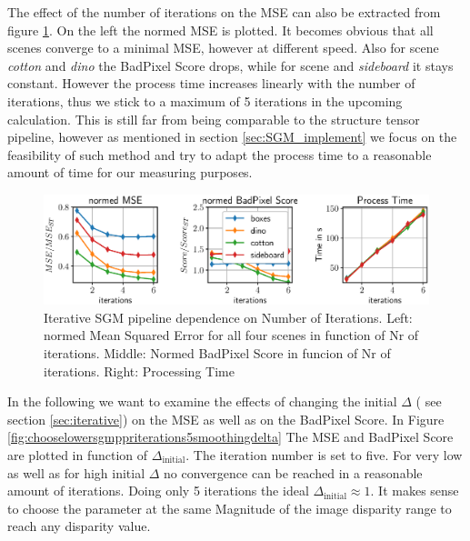 \documentclass  [
  paper    = a4,
  BCOR     = 10mm,
  twoside,
  fontsize = 12pt,
  fleqn,
  toc      = bibnumbered,
  toc      = listofnumbered,
  numbers  = noendperiod,
  headings = normal,
  listof   = leveldown,
  version  = 3.03
]                                       {scrreprt}
\begin{document}
The effect of the number of iterations on the MSE can also be extracted from figure \ref{fig:chooselowersgmpprmergeiterations}. On the left the normed MSE is plotted. It becomes obvious that all scenes converge to a minimal MSE, however at different speed. Also for scene \textit{cotton} and \textit{dino} the BadPixel Score drops, while for scene  and \textit{sideboard} it stays constant. However the process time increases linearly with the number of iterations, thus we stick to a maximum of 5 iterations in the upcoming calculation. This is still far from being comparable to the structure tensor pipeline, however as mentioned in section \ref{sec:SGM_implement} we focus on the feasibility of such method and try to adapt the process time to a reasonable amount of time for our measuring purposes.
\begin{figure}
	\centering
	\includegraphics[width=1\linewidth]{images/choose_lower_sgm_ppr_merge_iterations}
	\caption[Iterative SGM dependence on Number of Iterations]{Iterative SGM pipeline dependence on Number of Iterations. Left: normed Mean Squared Error for all four scenes in function  of Nr of iterations. Middle: Normed BadPixel Score in funcion of Nr of iterations. Right: Processing Time}
	\label{fig:chooselowersgmpprmergeiterations}
\end{figure}

In the following we want to examine the effects of changing the initial $\Delta$ ( see section \ref{sec:iterative}) on the MSE as well as on the BadPixel Score. In Figure \ref{fig:chooselowersgmppriterations5smoothingdelta} The MSE and BadPixel Score are plotted in function of $\Delta_\text{initial}$. The iteration number is set to five. For very low as well as for high initial $\Delta$ no convergence can be reached in a reasonable amount of iterations. Doing only 5 iterations the ideal $\Delta_\text{initial} \approx 1$. It makes sense to choose the parameter at the same Magnitude of the image disparity range to reach any disparity value.
\end{document}
